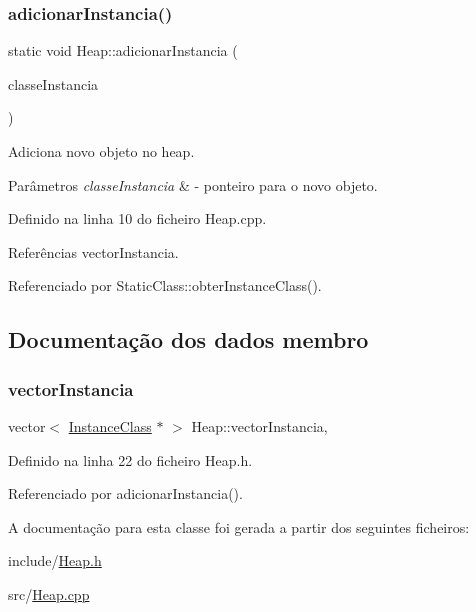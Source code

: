 \subsubsection{\texorpdfstring{adicionar\+Instancia()}{adicionarInstancia()}}
{\footnotesize\ttfamily static void Heap\+::adicionar\+Instancia (\begin{DoxyParamCaption}\item[{\hyperlink{classInstanceClass}{Instance\+Class} $\ast$}]{classe\+Instancia }\end{DoxyParamCaption})\hspace{0.3cm}{\ttfamily [static]}}



Adiciona novo objeto no heap. 


\begin{DoxyParams}{Parâmetros}
{\em classe\+Instancia} & -\/ ponteiro para o novo objeto. \\
\hline
\end{DoxyParams}


Definido na linha 10 do ficheiro Heap.\+cpp.



Referências vector\+Instancia.



Referenciado por Static\+Class\+::obter\+Instance\+Class().



\subsection{Documentação dos dados membro}
\mbox{\label{classHeap_a4d3e406962272918e1a6144827c13c0c}} 
\subsubsection{\texorpdfstring{vector\+Instancia}{vectorInstancia}}
{\footnotesize\ttfamily vector$<$ \hyperlink{classInstanceClass}{Instance\+Class} $\ast$ $>$ Heap\+::vector\+Instancia\hspace{0.3cm}{\ttfamily [static]}, {\ttfamily [private]}}



Definido na linha 22 do ficheiro Heap.\+h.



Referenciado por adicionar\+Instancia().



A documentação para esta classe foi gerada a partir dos seguintes ficheiros\+:\begin{DoxyCompactItemize}
\item 
include/\hyperlink{Heap_8h}{Heap.\+h}\item 
src/\hyperlink{Heap_8cpp}{Heap.\+cpp}\end{DoxyCompactItemize}
